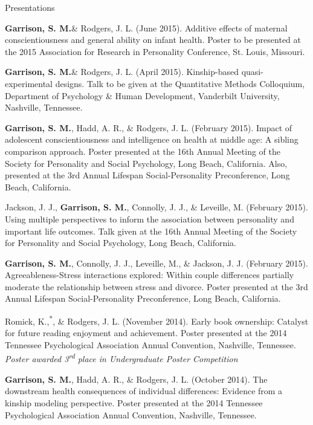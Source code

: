 \documentclass {resume}
\newcommand{\meb}{{\bf Garrison, S. M.}\xspace}
\newcommand{\student}{\hspace{-3.95pt}\textsuperscript{*}\hspace* {2 pt}}
\begin{document}
\begin{rSection}{\textrm{Presentations}}\begin{etaremune}
\item \meb \& Rodgers, J. L. (June 2015). Additive effects of maternal conscientiousness and general ability on infant health. Poster to be presented at the 2015 Association for Research in Personality Conference, St. Louis, Missouri.%
\item\meb \& Rodgers, J. L. (April 2015). Kinship-based quasi-experimental designs. Talk to be given at the Quantitative Methods Colloquium, Department of Psychology \& Human Development, Vanderbilt University, Nashville, Tennessee.
\item \meb, Hadd, A. R., \& Rodgers, J. L. (February 2015). Impact of adolescent conscientiousness and intelligence on health at middle age: A sibling comparison approach. Poster presented at the 16th Annual Meeting of the Society for Personality and  Social Psychology, Long Beach, California. Also, presented at the 3rd Annual Lifespan Social-Personality Preconference, Long Beach, California.
\item Jackson, J. J., \textbf{Garrison, S. M.}, Connolly, J. J., \& Leveille, M. (February 2015). Using multiple perspectives to inform the association between personality and important life outcomes. Talk given at the 16th Annual Meeting of the Society for Personality and  Social Psychology, Long Beach, California.
\item\meb, Connolly, J. J., Leveille, M., \& Jackson, J. J. (February 2015). Agreeableness-Stress interactions explored: Within couple differences partially moderate the relationship between stress and divorce. Poster presented at the 3rd Annual Lifespan Social-Personality Preconference, Long Beach, California.
\item Romick, K.,\student \meb, \& Rodgers, J. L. (November 2014). Early book ownership: Catalyst for future reading enjoyment and achievement. Poster presented at the 2014 Tennessee Psychological Association Annual Convention, Nashville, Tennessee. \textit{Poster awarded 3\textsuperscript{rd} place in Undergraduate Poster Competition}
\item\meb, Hadd, A. R., \& Rodgers, J. L. (October 2014). The downstream health consequences of individual differences: Evidence from a kinship modeling perspective. Poster presented at the 2014 Tennessee Psychological Association Annual Convention, Nashville, Tennessee.

\end{etaremune}
\end{rSection}
\end{document}
